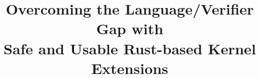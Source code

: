 \documentclass[sigplan,screen,nonacm]{acmart}
\begin{document}
\title[Overcoming the Language/Verifier Gap with Safe and Usable Rust-based Kernel Extensions]{Overcoming the Language/Verifier Gap with\\ Safe and Usable Rust-based Kernel Extensions}







\maketitle









%




% 
\end{document}
